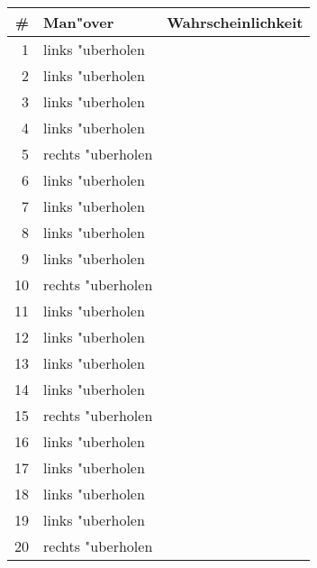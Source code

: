 \documentclass[a4paper,10pt]{scrartcl}
\begin{document}
\begin{center}
\begin{tabular}{|r|l|r|}
\hline
\bf \# & \bf Man"over & \bf Wahrscheinlichkeit\\ \hline
1 & links "uberholen & \\ \hline
2 & links "uberholen & \\ \hline
3 & links "uberholen & \\ \hline
4 & links "uberholen & \\ \hline
5 & rechts "uberholen & \\ \hline
6 & links "uberholen & \\ \hline
7 & links "uberholen & \\ \hline
8 & links "uberholen & \\ \hline
9 & links "uberholen & \\ \hline
10 & rechts "uberholen & \\ \hline
11 & links "uberholen & \\ \hline
12 & links "uberholen & \\ \hline
13 & links "uberholen & \\ \hline
14 & links "uberholen & \\ \hline
15 & rechts "uberholen & \\ \hline
16 & links "uberholen & \\ \hline
17 & links "uberholen & \\ \hline
18 & links "uberholen & \\ \hline
19 & links "uberholen & \\ \hline
20 & rechts "uberholen & \\ \hline
\end{tabular}
\end{center}
\end{document}
